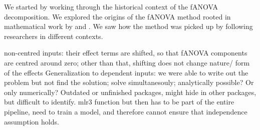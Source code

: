We started by working through the historical context of the fANOVA decomposition. We explored the origins of the fANOVA method rooted in mathematical work by \cite{hoeffding1948} and \cite{sobol1993sensitivity}. We saw how the method was picked up by following researchers in different contexts.







non-centred inputs: their effect terms are shifted, so that fANOVA components are centred around zero; other than that,
shifting does not change nature/ form of the effects
Generalization to dependent inputs: we were able to write out the problem but not find the solution; solve simultanesouly; 
analytically possible? Or only numerically?
Outdated or unfinished packages, might hide in other packages, but difficult to identify.
mlr3 function but then has to be part of the entire pipeline, need to train a model, and therefore cannot ensure that independence assumption holds.

